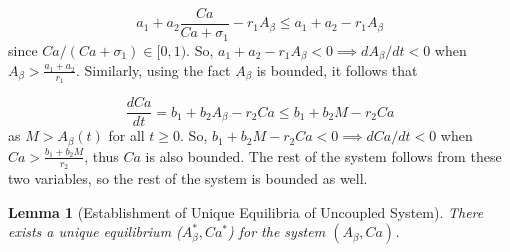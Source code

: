\documentclass[12pt]{article}
\newtheorem{lem}{Lemma}
\theoremstyle{definition}
\begin{document}
\begin{equation*}
    a_1 + a_2\frac{Ca}{Ca + \sigma_1} - r_1 A_\beta \leq a_1 + a_2 - r_1 A_\beta
\end{equation*}
since $Ca/(Ca+\sigma_1)\in [0,1)$. 
So, $a_1 + a_2 - r_1 A_{\beta} < 0 \implies dA_\beta/dt < 0$ when $A_{\beta} > \frac{a_1 + a_2}{r_1}$. Similarly, using the fact $A _{\beta}$ is bounded, it follows that 

\begin{equation*}
    \frac{dCa}{dt} = b_1 + b_2 A_{\beta} - r_2 Ca \leq b_1 + b_2 M - r_2 Ca
\end{equation*}
as $M > A_{\beta} (t)$ for all $t \geq 0$. So, $b_1 + b_2 M - r_2 Ca < 0 \implies dCa/dt < 0$ when $Ca > \frac{b_1 + b_2 M}{r_2}$, thus $Ca$ is also bounded. The rest of the system follows from these two variables, so the rest of the system is bounded as well. \bigskip

\begin{lem}[Establishment of Unique Equilibria of Uncoupled System]\label{lem1}
    There exists a unique equilibrium ($A _{\beta}^{*}, Ca ^{*}$) for the system $(A_\beta, Ca)$.
\end{lem}
\end{document}
